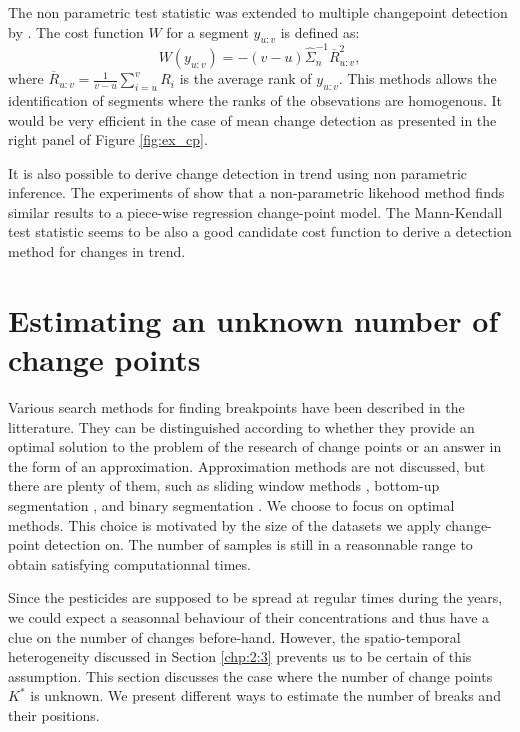 The non parametric test statistic was extended to multiple changepoint detection by \cite{lung2015}. The cost function $W$ for a segment $y_{u:v}$ is defined as: 
\begin{equation}\label{chp2:costfuncnp}
  W(y_{u:v}) = -(v-u)\hat{\Sigma}^{-1}_n\overline{R}^2_{u:v},
\end{equation}
where $\overline{R}_{u:v} = \frac{1}{v-u}\sum_{i = u}^vR_i$ is the average rank of $y_{u:v}$.
This methods allows the identification of segments where the ranks of the obsevations are homogenous. It would be very efficient in the case of mean change detection as presented in the right panel of Figure \ref{fig:ex_cp}.  

It is also possible to derive change detection in trend using non parametric inference. The experiments of \cite{Haynes2016} show that a non-parametric likehood method finds similar results to a piece-wise regression change-point model. The Mann-Kendall test statistic \citep{Pohlert2020,1994a} seems to be also a good candidate cost function to derive a detection method for changes in trend.  

\section{Estimating an unknown number of change points}\label{chp:3:2}

Various search methods for finding breakpoints have been described in the litterature. They can be distinguished according to whether they provide an optimal solution to the problem of the research of change points or an answer in the form of an approximation. Approximation methods are not discussed, but there are plenty of them, such as sliding window methods \citep{Li2010,Liu2022}, bottom-up segmentation \citep{chen1998speaker}, and binary segmentation \citep{Yang2001,Fryzlewicz2014}. We choose to focus on optimal methods. This choice is motivated by the size of the datasets we apply change-point detection on. The number of samples is still in a reasonnable range to obtain satisfying computationnal times.  

Since the pesticides are supposed to be spread at regular times during the years, we could expect a seasonnal behaviour of their concentrations and thus have a clue on the number of changes before-hand. However, the spatio-temporal heterogeneity discussed in Section \ref{chp:2:3} prevents us to be certain of this assumption. This section discusses the case where the number of change points $K^*$ is unknown. We present different ways to estimate the number of breaks and their positions.  

